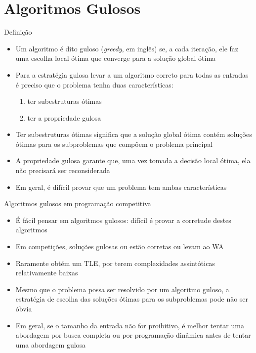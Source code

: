 \section{Algoritmos Gulosos}

\begin{frame}[fragile]{Definição}

    \begin{itemize}
        \item Um algoritmo é dito guloso (\textit{greedy}, em inglês) se, a cada iteração,
            ele faz uma escolha local ótima que converge para a solução global ótima

        \item Para a estratégia gulosa levar a um algoritmo correto para todas as entradas
            é preciso que o problema tenha duas características:

        \begin{enumerate}
            \item ter subestruturas ótimas
            \item ter a propriedade gulosa
        \end{enumerate}

        \item Ter  subestruturas ótimas significa que a solução global ótima contém soluções
            ótimas para os subproblemas que compõem o problema principal

        \item A propriedade gulosa garante que, uma vez tomada a decisão local ótima, ela não
            precisará ser reconsiderada 

        \item Em geral, é difícil provar que um problema tem ambas características
    \end{itemize}

\end{frame}

\begin{frame}[fragile]{Algoritmos gulosos em programação competitiva}

    \begin{itemize}
        \item É fácil pensar em algoritmos gulosos: difícil é provar a corretude destes algoritmos

        \item Em competições, soluções gulosas ou estão corretas ou levam ao WA

        \item Raramente obtém um TLE, por terem complexidades assintóticas relativamente baixas

        \item Mesmo que o problema possa ser resolvido por um algoritmo guloso, a estratégia 
            de escolha das soluções ótimas para os subproblemas pode não ser óbvia

        \item Em geral, se o tamanho da entrada não for proibitivo, é melhor tentar uma abordagem
            por busca completa ou por programação dinâmica antes de tentar uma abordagem gulosa
    \end{itemize}

\end{frame}
